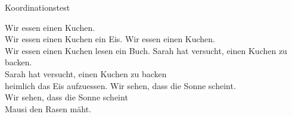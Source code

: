\begin{frame}
  {Koordinationstest}
  \pause
  \begin{exe}
    \ex\label{ex:konstituententests041}
    \begin{xlist}
      \ex Wir essen \alert<3->{einen Kuchen}.\\
      \pause
         Wir essen \alert{einen Kuchen}  \alert{ein Eis}.
      \pause
      \ex Wir \alert<5->{essen einen Kuchen}.\\
      \pause
         Wir \alert{essen einen Kuchen}  \alert{lesen ein Buch}.
      \pause
      \ex Sarah hat versucht, \alert<7->{einen Kuchen zu backen}.\\
      \pause
         Sarah hat versucht, \alert{einen Kuchen zu backen}  \\{}\alert{heimlich das Eis aufzuessen}.
      \pause
      \ex Wir sehen, dass \alert<9->{die Sonne scheint}.\\
      \pause
         Wir sehen, dass \alert{die Sonne scheint}  \\{}\alert{Mausi den Rasen mäht}.
    \end{xlist}
  \end{exe}
  \pause
  \begin{exe}
    \end{exe}
\end{frame}

